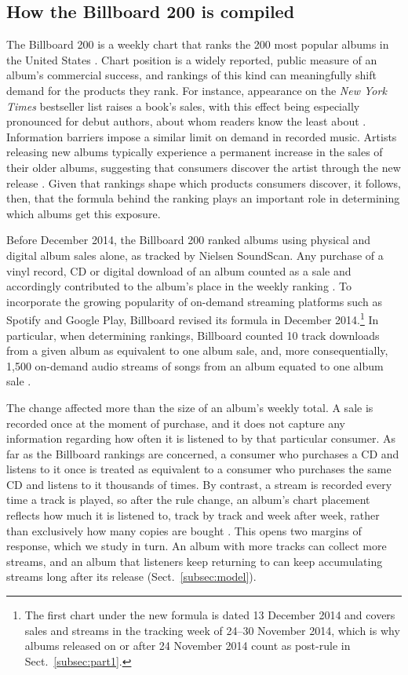 \documentclass[pdflatex,sn-apa]{sn-jnl}
\begin{document}
\subsection{How the Billboard 200 is compiled}\label{subsec:billboard}
The Billboard 200 is a weekly chart that ranks the 200 most popular albums in the United States \citep{billboard2014makeover}. Chart position is a widely reported, public measure of an album's commercial success, and rankings of this kind can meaningfully shift demand for the products they rank. For instance, appearance on the \emph{New York Times} bestseller list raises a book's sales, with this effect being especially pronounced for debut authors, about whom readers know the least about \citep{sorensen2007bestseller}. Information barriers impose a similar limit on demand in recorded music. Artists releasing new albums typically experience a permanent increase in the sales of their older albums, suggesting that consumers discover the artist through the new release \citep{hendricks2009information}. Given that rankings shape which products consumers discover, it follows, then, that the formula behind the ranking plays an important role in determining which albums get this exposure.

Before December 2014, the Billboard 200 ranked albums using physical and digital album sales alone, as tracked by Nielsen SoundScan. Any purchase of a vinyl record, CD or digital download of an album counted as a sale and accordingly contributed to the album's place in the weekly ranking \citep{billboard2014makeover}. To incorporate the growing popularity of on-demand streaming platforms such as Spotify and Google Play, Billboard revised
its formula in December 2014.\footnote{The first chart under the
new formula is dated 13 December 2014 and covers sales and streams
in the tracking week of 24--30 November 2014, which is why albums
released on or after 24 November 2014 count as post-rule in
Sect.~\ref{subsec:part1}.} In particular, when determining rankings, Billboard counted 10 track downloads from a given album as equivalent to one album sale, and, more consequentially, 1,500 on-demand audio streams of songs from an album equated to one album sale \citep{billboard2014makeover}.

The change affected more than the size of an album's weekly total. A sale is recorded once at the moment of purchase, and it does not capture any information regarding how often it is listened to by that particular consumer. As far as the Billboard rankings are concerned, a consumer who purchases a CD and listens to it once is treated as equivalent to a consumer who purchases the same CD and listens to it thousands of times. By contrast, a stream is recorded every time a track is played, so after the rule change, an album's chart placement reflects how much it is listened to, track by track and week after week, rather than exclusively how many copies are bought \citep{billboard2014makeover}. This opens two margins of response, which we study in turn. An album with more tracks can collect more streams, and an album that listeners keep returning to can keep accumulating streams long after its release (Sect.~\ref{subsec:model}).
\end{document}
